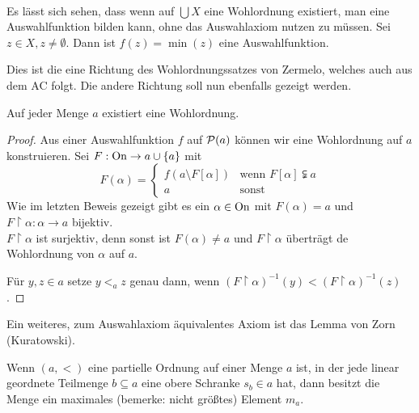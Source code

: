 \\

Es lässt sich sehen, dass wenn auf $\bigcup X$ eine Wohlordnung existiert, man eine Auswahlfunktion bilden kann, ohne das Auswahlaxiom nutzen zu müssen. Sei $z\in X, z\neq\emptyset$. Dann ist $f(z)=\min(z)$ eine Auswahlfunktion. 

Dies ist die eine Richtung des Wohlordnungssatzes von Zermelo, welches auch aus dem AC folgt. Die andere Richtung soll nun ebenfalls gezeigt werden.

\begin{satz}
	Auf jeder Menge $a$ existiert eine Wohlordnung.
\end{satz}
\begin{proof}
	Aus einer Auswahlfunktion $f$ auf $\mathcal{P}(a)$ können wir eine Wohlordnung auf $a$ konstruieren. Sei $F:\operatorname{On}\to a\cup \{a\}$ mit
	$$
	F(\alpha)=\begin{cases}
		f(a\setminus F[\alpha]) & \text{wenn } F[\alpha]\subsetneqq a \\
		a & \text{sonst}
	\end{cases}
	$$
	Wie im letzten Beweis gezeigt gibt es ein $\alpha\in \operatorname{On}$ mit $F(\alpha)=a$ und $F\upharpoonright \alpha:\alpha\to a$ bijektiv.
	\\
	$F\upharpoonright\alpha$ ist surjektiv, denn sonst ist $F(\alpha)\neq a$ und $F\upharpoonright\alpha$ überträgt de Wohlordnung von $\alpha$ auf $a$. 
	
	Für $y,z\in a$ setze $y <_a z$ genau dann, wenn $(F\upharpoonright\alpha)^{-1}(y) < (F\upharpoonright\alpha)^{-1}(z)$.
\end{proof}

Ein weiteres, zum Auswahlaxiom äquivalentes Axiom ist das Lemma von Zorn (Kuratowski).

\begin{definition}
	Wenn $(a,<)$ eine partielle Ordnung auf einer Menge $a$ ist, in der jede linear geordnete Teilmenge $b\subseteq a$ eine obere Schranke $s_b\in a$ hat, dann besitzt die Menge ein maximales (bemerke: nicht größtes) Element $m_a$.
\end{definition}

